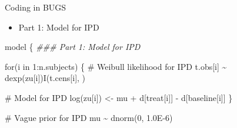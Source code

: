 \documentclass[
  ignorenonframetext,
]{beamer}
\newenvironment{Shaded}{\begin{snugshade}}{\end{snugshade}}
\newcommand{\CommentTok}[1]{\textcolor[rgb]{0.37,0.37,0.37}{#1}}
\newcommand{\ControlFlowTok}[1]{\textcolor[rgb]{0.00,0.23,0.31}{#1}}
\newcommand{\DecValTok}[1]{\textcolor[rgb]{0.68,0.00,0.00}{#1}}
\newcommand{\DocumentationTok}[1]{\textcolor[rgb]{0.37,0.37,0.37}{\textit{#1}}}
\newcommand{\FloatTok}[1]{\textcolor[rgb]{0.68,0.00,0.00}{#1}}
\newcommand{\FunctionTok}[1]{\textcolor[rgb]{0.28,0.35,0.67}{#1}}
\newcommand{\NormalTok}[1]{\textcolor[rgb]{0.00,0.23,0.31}{#1}}
\newcommand{\OtherTok}[1]{\textcolor[rgb]{0.00,0.23,0.31}{#1}}
\newcommand{\SpecialCharTok}[1]{\textcolor[rgb]{0.37,0.37,0.37}{#1}}
\providecommand{\tightlist}{%
  \setlength{\itemsep}{0pt}\setlength{\parskip}{0pt}}\usepackage{longtable,booktabs,array}
\begin{document}
\begin{frame}[fragile]{Coding in BUGS}
\protect\hypertarget{coding-in-bugs}{}
\begin{itemize}
\tightlist
\item
  {Part 1}: Model for IPD
\end{itemize}

\begin{Shaded}
\begin{Highlighting}[numbers=left,,]
\NormalTok{model \{}
  \DocumentationTok{\#\#\# Part 1: Model for IPD}
  
  \ControlFlowTok{for}\NormalTok{(i }\ControlFlowTok{in} \DecValTok{1}\SpecialCharTok{:}\NormalTok{n.subjects) \{}
    \CommentTok{\# Weibull likelihood for IPD}
\NormalTok{    t.obs[i] }\SpecialCharTok{\textasciitilde{}} \FunctionTok{dexp}\NormalTok{(zu[i])}\FunctionTok{I}\NormalTok{(t.cens[i], )}
    
    \CommentTok{\# Model for IPD}
    \FunctionTok{log}\NormalTok{(zu[i]) }\OtherTok{\textless{}{-}}\NormalTok{ mu }\SpecialCharTok{+}\NormalTok{ d[treat[i]] }\SpecialCharTok{{-}}\NormalTok{ d[baseline[i]]}
\NormalTok{  \}}
  
  \CommentTok{\# Vague prior for IPD}
\NormalTok{  mu }\SpecialCharTok{\textasciitilde{}} \FunctionTok{dnorm}\NormalTok{(}\DecValTok{0}\NormalTok{, }\FloatTok{1.0E{-}6}\NormalTok{)}
\end{Highlighting}
\end{Shaded}
\end{frame}
\end{document}
